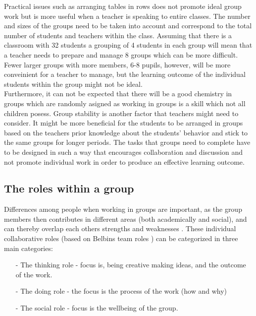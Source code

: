 Practical issues such as arranging tables in rows does not promote ideal group work but is more useful when a teacher is speaking to entire classes. The number and sizes of the groups need to be taken into account and correspond to the total number of students and teachers within the class. Assuming that there is a classroom with 32 students a grouping of 4 students in each group will mean that a teacher needs to prepare and manage 8 groups which can be more difficult. Fewer larger groups with more members, 6-8 pupils, however, will be more conveinient for a teacher to manage, but the learning outcome of the individual students within the group might not be ideal\cite{collaborationSocialPedagogy}.\\

Furthermore, it can not be expected that there will be a good chemistry in groups which are randomly asigned as working in groups is a skill which not all children posess. Group stability is another factor that teachers might need to consider. It might be more beneficial for the students to be arranged in groups based on the teachers prior knowledge about the students' behavior and stick to the same groups for longer periods. The tasks that groups need to complete have to be designed in such a way that encourages collaboration and discussion and not promote individual work in order to produce an effective learning outcome\cite{collaborationSocialPedagogy}.



\subsection{The roles within a group}
Differences among people when working in groups are important, as the group members then contributes in different areas (both academically and social), and can thereby overlap each others strengths and weaknesses \cite{ProjektarbejdesKompleksitet}. These individual collaborative roles (based on Belbins team roles \cite{ProjektarbejdesKompleksitet}) can be categorized in three main categories: 
\begin{itemize}
	\item[-] The thinking role - focus is, being creative making ideas, and the outcome of the work. 
	\item[-] The doing role - the focus is the process of the work (how and why)
	\item[-] The social role - focus is the wellbeing of the group. 
\end{itemize}

